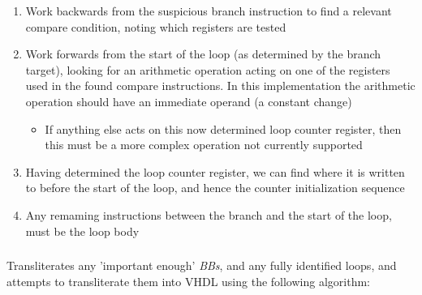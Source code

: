 \documentclass[a4paper]{article}
\begin{document}
\begin{enumerate}
  \item Work backwards from the suspicious branch instruction to find a relevant compare condition, noting which registers are tested
  \item Work forwards from the start of the loop (as determined by the branch target), looking for an arithmetic operation acting on one of the registers used in the found compare instructions. In this implementation the arithmetic operation should have an immediate operand (a constant change)
    \begin{itemize}
      \item If anything else acts on this now determined loop counter register, then this must be a more complex operation not currently supported
    \end{itemize}
  \item Having determined the loop counter register, we can find where it is written to before the start of the loop, and hence the counter initialization sequence
  \item Any remaming instructions between the branch and the start of the loop, must be the loop body
\end{enumerate}

\subsubsection{}

Transliterates any 'important enough' \emph{BBs}, and any fully identified loops, and attempts to transliterate them into VHDL using the following algorithm:
\end{document}
